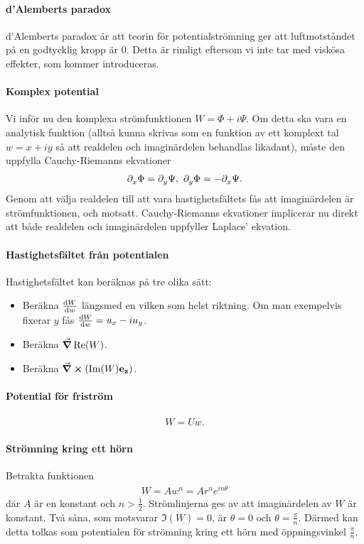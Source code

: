 \paragraph{d'Alemberts paradox}
d'Alemberts paradox är att teorin för potentialströmning ger att luftmotståndet på en godtycklig kropp är $0$. Detta är rimligt eftersom vi inte tar med viskösa effekter, som kommer introduceras.

\paragraph{Komplex potential}
Vi inför nu den komplexa strömfunktionen $W = \Phi + i\Psi$. Om detta ska vara en analytisk funktion (alltså kunna skrivas som en funktion av ett komplext tal $w = x + iy$ så att realdelen och imaginärdelen behandlas likadant), måste den uppfylla Cauchy-Riemanns ekvationer
\begin{align*}
	\partial_{x}^{}\Phi = \partial_{y}^{}\Psi,\ \partial_{y}^{}\Phi = -\partial_{x}^{}\Psi.
\end{align*}
Genom att välja realdelen till att vara hastighetsfältets fås att imaginärdelen är strömfunktionen, och motsatt. Cauchy-Riemanns ekvationer implicerar nu direkt att både realdelen och imaginärdelen uppfyller Laplace' ekvation.

\paragraph{Hastighetsfältet från potentialen}
Hastighetsfältet kan beräknas på tre olika sätt:
\begin{itemize}
	\item Beräkna $\dv{W}{w}$ längsmed en vilken som helst riktning. Om man exempelvis fixerar $y$ fås $\dv{W}{w} = u_{x} - iu_{y}$.
	\item Beräkna $\grad{\Re(W)}$.
	\item Beräkna $\curl(\Im(W)\vb{e}_{\vb{z}})$.
\end{itemize}

\paragraph{Potential för friström}
\begin{align*}
	W = Uw.
\end{align*}

\paragraph{Strömning kring ett hörn}
Betrakta funktionen
\begin{align*}
	W = Aw^{n} = Ar^{n}e^{in\theta}
\end{align*}
där $A$ är en konstant och $n > \frac{1}{2}$. Strömlinjerna ges av att imaginärdelen av $W$ är konstant. Två såna, som motsvarar $\Im(W) = 0$, är $\theta = 0$ och $\theta = \frac{\pi}{n}$. Därmed kan detta tolkas som potentialen för strömning kring ett hörn med öppningsvinkel $\frac{\pi}{n}$.

